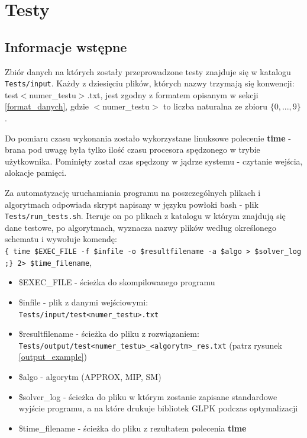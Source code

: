 \chapter{Testy}  
\thispagestyle{chapterBeginStyle}
\label{ch:CHAPTER_4}

\section{Informacje wstępne}
Zbiór danych na których zostały przeprowadzone testy znajduje się w katalogu \verb|Tests/input|. Każdy z dziesięciu plików, których nazwy trzymają się konwencji: test$<$numer\_testu$>$.txt, jest zgodny z formatem opisanym w sekcji \ref{format_danych}, gdzie $<$numer\_testu$>$ to liczba naturalna ze zbioru $\{0, ..., 9\}$.

Do pomiaru czasu wykonania zostało wykorzystane linuksowe polecenie \textbf{time} - brana pod uwagę była tylko ilość czasu procesora spędzonego w trybie użytkownika. Pominięty został czas spędzony w jądrze systemu - czytanie wejścia, alokacje pamięci.

Za automatyzację uruchamiania programu na poszczególnych plikach i algorytmach odpowiada skrypt napisany w języku powłoki bash - plik \verb|Tests/run_tests.sh|. Iteruje on po plikach z katalogu w którym znajdują się dane testowe, po algorytmach, wyznacza nazwy plików według określonego schematu i wywołuje komendę: \\
\verb|{ time $EXEC_FILE -f $infile -o $resultfilename -a $algo > $solver_log ;} 2> $time_filename|, 

\begin{itemize}
	\item \$EXEC\_FILE - ścieżka do skompilowanego programu
	\item \$infile - plik z danymi wejściowymi: \\
	\verb|Tests/input/test<numer_testu>.txt|
	\item \$resultfilename - ścieżka do pliku z rozwiązaniem: \\ \verb|Tests/output/test<numer_testu>_<algorytm>_res.txt| (patrz rysunek \ref{output_example})
	\item \$algo - algorytm (APPROX, MIP, SM)
	\item \$solver\_log - ścieżka do pliku w którym zostanie zapisane standardowe wyjście programu, a na które drukuje bibliotek GLPK podczas optymalizacji
	\item \$time\_filename - ścieżka do pliku z rezultatem polecenia \textbf{time}
\end{itemize}

